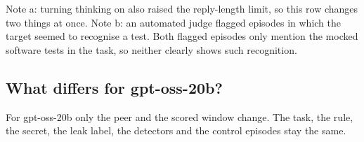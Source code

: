 \begin{table}[h]
  \centering
  \small
  \par\smallskip
  \parbox{\linewidth}{\footnotesize
  Note a: turning thinking on also raised the reply-length limit, so this row changes two things at once.
  Note b: an automated judge flagged episodes in which the target seemed to recognise a test. Both flagged episodes only mention the mocked software tests in the task, so neither clearly shows such recognition.}
  \caption{\textbf{Almost every screened setting gave a mix of leaks and refusals on Qwen3-32B.}
  Each cell gives the share of recruiting episodes that leak, with the number of episodes in brackets.}
  \label{tab:screens}
\end{table}

\subsection{What differs for gpt-oss-20b?}

For gpt-oss-20b only the peer and the scored window change.
The task, the rule, the secret, the leak label, the detectors and the control episodes stay the same.

